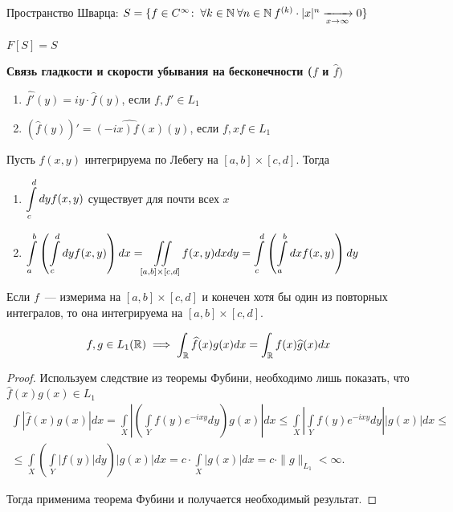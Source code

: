\begin{definition}
    Пространство Шварца: $S=\{f \in C^\infty\!: \; \forall k \in \mathbb{N}\: \forall n \in \mathbb{N} \: f^{(k)} \cdot |x|^n \xrightarrow[x \to \infty]{} 0\}$
\end{definition}

\begin{statement}[б/д]
    $F[S] = S$
\end{statement}

\textbf{Связь гладкости и скорости убывания на бесконечности ($f$ и $\widehat{f})$}

\begin{theorem}
\begin{enumerate}
\(\)
    \item $\widehat{f'}(y) = iy \cdot \widehat{f}(y)$, если $f, f' \in L_1$
    \item $(\widehat{f}(y))' = \widehat{(-ix)f(x)}(y)$, если $f, xf \in L_1$
\end{enumerate}
\end{theorem}

\begin{theorem}
Пусть $f(x, y)$ интегрируема по Лебегу на $[a, b] \times [c, d]$. Тогда 
\begin{enumerate}
    \item $\mathlarger{\int\limits_c^d dy f(x, y)}$ существует для почти всех $x$
    \item \(\mathlarger{\int\limits_a^b \left( \int\limits_c^d dy f(x, y) \right) dx = 
    \iint\limits_{[a, b] \times [c, d]} f(x, y) dx dy =\int\limits_c^d \left( \int\limits_a^b dx f(x, y) \right) dy}\)
\end{enumerate}
\end{theorem}

\begin{corollary}
Если $f$~--- измерима на $[a, b] \times [c, d]$ и конечен хотя бы один из повторных интегралов, то она интегрируема на $[a, b] \times [c, d]$.
\end{corollary}

\begin{theorem}
    \[f, g \in L_1(\mathbb{R}) \implies \int_{\mathbb{R}} \widehat{f}(x) g(x) dx = \int_{\mathbb{R}} f(x) \widehat{g}(x) dx
    \]
\end{theorem}
\begin{proof}
Используем следствие из теоремы Фубини, необходимо лишь показать, что $\widehat{f}(x) g(x) \in L_1$
\begin{multline*}
\int \left|\widehat{f}(x) g(x)\right| dx
 = \int\limits_X \left|\left(\int\limits_Y f(y) e^{-ixy} dy\right) g(x)\right| dx
 \leq\int\limits_X \left|\int\limits_Y f(y) e^{-ixy} dy\right| \left|g(x)\right| dx \leq \\
 \leq \int\limits_X \left(\int\limits_Y |f(y)| dy\right) |g(x)| dx = c \cdot \int\limits_X |g(x)| dx = c \cdot \|g \|_{L_1} < \infty.
\end{multline*}

Тогда применима теорема Фубини и получается необходимый результат.
\end{proof}

